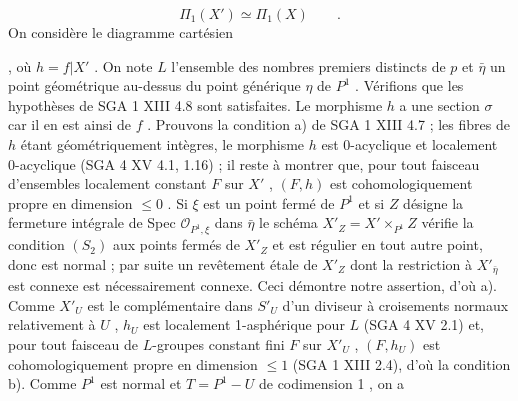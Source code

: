 \begin{equation*}
\Pi_1(X') \simeq \Pi_1(X) \qquad .
\end{equation*}
On considère le diagramme cartésien

\qquad ,
où $h = f|X'$ . On note $L$ l'ensemble des nombres premiers distincts de $p$ et $\bar{\eta}$ un point géométrique au-dessus du point générique $\eta$ de $P^1$ . Vérifions que les hypothèses de SGA 1 XIII 4.8 sont satisfaites. Le morphisme $h$ a une section $\sigma$ car il en est ainsi de $f$ . Prouvons la condition a) de SGA 1 XIII 4.7 ; les fibres de $h$ étant géométriquement intègres, le morphisme $h$ est 0-acyclique et localement 0-acyclique (SGA 4 XV 4.1, 1.16) ; il reste à montrer que, pour tout faisceau d'ensembles localement constant $F$ sur $X'$ , $(F,h)$ est cohomologiquement propre en dimension $\leqslant 0$ . Si $\xi$ est un point fermé de $P^1$ et si $Z$ désigne la fermeture intégrale de Spec $\mathcal{O}_{P^1,\xi}$ dans $\bar{\eta}$ le schéma $X'_Z = X'\times_{P^1} Z$ vérifie la condition $(S_2)$ aux points fermés de $X'_Z$ et est régulier en tout autre point, donc est normal ; par suite un revêtement étale de $X'_Z$ dont la restriction à $X'_{\bar{\eta}}$ est connexe est nécessairement connexe. Ceci démontre notre assertion, d'où a). Comme $X'_U$ est le complémentaire dans $S'_U$ d'un diviseur à croisements normaux relativement à $U$ , $h_U$ est localement 1-asphérique pour $L$ (SGA 4 XV 2.1) et, pour tout faisceau de $L$-groupes constant fini $F$ sur $X'_U$ , $(F,h_U)$ est cohomologiquement propre en dimension $\leqslant 1$ (SGA 1 XIII 2.4), d'où la condition b). Comme $P^1$ est normal et $T = P^1 - U$ de
codimension 1 , on a

